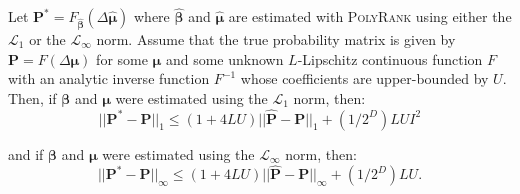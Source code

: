 \documentclass[twoside,11pt]{article}
\begin{document}

\begin{proposition}%
\label{the:analytic_sensitivity_LS}
Let $\boldsymbol{P^*} = F_{\boldsymbol{\hat{\beta}}}\left(\Delta \boldsymbol{\hat{\mu}}\right)$ where $\boldsymbol{\hat{\beta}}$ and $\boldsymbol{\hat{\mu}}$ are estimated with \textsc{PolyRank} using either the $\mathcal{L}_1$ or the $\mathcal{L}_{\infty}$ norm. Assume that the true probability matrix is given by  $\boldsymbol{P} = F(\Delta \boldsymbol{\mu})$ for some $\boldsymbol{\mu}$ and some unknown $L$-Lipschitz continuous function $F$ with an analytic inverse function $F^{-1}$ whose coefficients are upper-bounded by $U$. Then, if $\boldsymbol{\beta}$ and $\boldsymbol{\mu}$ were estimated using the $\mathcal{L}_1$ norm, then:
\begin{equation}
||\boldsymbol{P^*} - \boldsymbol{P}||_1\leq (1+4LU)||\boldsymbol{\hat{P}} - \boldsymbol{P}||_1  + (1/2^D)LUI^2
\end{equation}

and if $\boldsymbol{\beta}$ and $\boldsymbol{\mu}$ were estimated using the $\mathcal{L}_{\infty}$ norm, then:
\begin{equation}
||\boldsymbol{P^*} - \boldsymbol{P}||_{\infty}\leq (1+4LU)||\boldsymbol{\hat{P}} - \boldsymbol{P}||_{\infty}  + (1/2^D)LU.
\end{equation}
\end{proposition}
\end{document}
